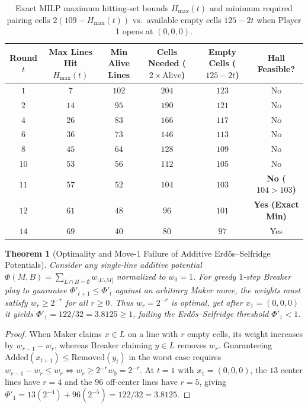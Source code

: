 \documentclass[11pt,a4paper]{article}
\newtheorem{theorem}{Theorem}[section]
\theoremstyle{definition}
\theoremstyle{remark}
\begin{document}
\begin{table}[ht!]
\centering
\caption{Exact MILP maximum hitting-set bounds $H_{\max}(t)$ and minimum required pairing cells $2(109 - H_{\max}(t))$ vs.\ available empty cells $125 - 2t$ when Player 1 opens at $(0,0,0)$.}
\label{tab:milp_horizon}
\begin{tabular}{cccccc}
\toprule
\textbf{Round $t$} & \textbf{Max Lines Hit $H_{\max}(t)$} & \textbf{Min Alive Lines} & \textbf{Cells Needed ($2 \times \text{Alive}$)} & \textbf{Empty Cells ($125-2t$)} & \textbf{Hall Feasible?} \\
\midrule
$1$  & $7$  & $102$ & $204$ & $123$ & No \\
$2$  & $14$ & $95$  & $190$ & $121$ & No \\
$4$  & $26$ & $83$  & $166$ & $117$ & No \\
$6$  & $36$ & $73$  & $146$ & $113$ & No \\
$8$  & $45$ & $64$  & $128$ & $109$ & No \\
$10$ & $53$ & $56$  & $112$ & $105$ & No \\
$11$ & $57$ & $52$  & $104$ & $103$ & \textbf{No ($104 > 103$)} \\
$12$ & $61$ & $48$  & $96$  & $101$ & \textbf{Yes (Exact Min)} \\
$14$ & $69$ & $40$  & $80$  & $97$  & Yes \\
\bottomrule
\end{tabular}
\end{table}

\begin{theorem}[Optimality and Move-1 Failure of Additive Erd\H{o}s--Selfridge Potentials]
\label{thm:nogo3}
Consider any single-line additive potential $\Phi(M, B) = \sum_{L \cap B = \emptyset} w_{|L \setminus M|}$ normalized to $w_0 = 1$. For greedy $1$-step Breaker play to guarantee $\Phi'_{t+1} \le \Phi'_t$ against an arbitrary Maker move, the weights must satisfy $w_r \ge 2^{-r}$ for all $r \ge 0$. Thus $w_r = 2^{-r}$ is optimal, yet after $x_1 = (0,0,0)$ it yields $\Phi'_1 = 122/32 = 3.8125 \ge 1$, failing the Erd\H{o}s--Selfridge threshold $\Phi'_1 < 1$.
\end{theorem}
\begin{proof}
When Maker claims $x \in L$ on a line with $r$ empty cells, its weight increases by $w_{r-1} - w_r$, whereas Breaker claiming $y \in L$ removes $w_r$. Guaranteeing $\text{Added}(x_{t+1}) \le \text{Removed}(y_t)$ in the worst case requires $w_{r-1} - w_r \le w_r \iff w_r \ge 2^{-r} w_0 = 2^{-r}$. At $t=1$ with $x_1 = (0,0,0)$, the $13$ center lines have $r=4$ and the $96$ off-center lines have $r=5$, giving $\Phi'_1 = 13(2^{-4}) + 96(2^{-5}) = 122/32 = 3.8125$.
\end{proof}
\end{document}
